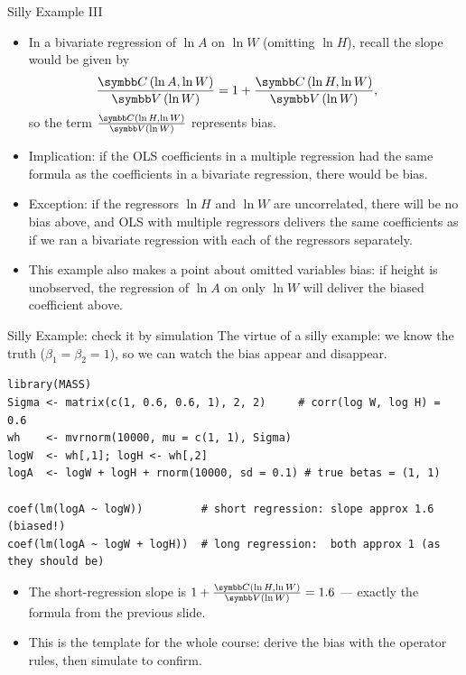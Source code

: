 \documentclass[aspectratio=169,11pt]{beamer}
\begin{document}
\begin{frame}{Silly Example III}
	\begin{itemize}
	\item In a bivariate regression of $\ln A$ on $\ln W$ (omitting $\ln H$), recall the slope would be given by \[
	\hspace*{-.5cm}\frac{\Cov\left(\ln A,\ln W\right)}{\Var\left(\ln W\right)}=1+\frac{\Cov\left(\ln H,\ln W\right)}{\Var\left(\ln W\right)},
	\]
	so the term $\frac{\Cov\left(\ln H,\ln W\right)}{\Var\left(\ln W\right)}$ represents bias. 

	\smallskip
	\item Implication: if the OLS coefficients in a multiple regression had the same formula 
	as the coefficients in a bivariate regression, there would be bias. 

	\smallskip
	\item Exception: if the regressors $\ln H$ and $\ln W$ are uncorrelated, there will be no bias above, and
	OLS with multiple regressors delivers the same coefficients as if we ran a bivariate regression with each
	of the regressors separately. 

	\smallskip
	\item This example also makes a point about omitted variables bias: if height is unobserved, the regression
	of $\ln A$ on only $\ln W$ will deliver the biased coefficient above.

\end{itemize}
\end{frame}


\begin{frame}[fragile]{Silly Example: check it by simulation}
The virtue of a silly example: we \alert{know} the truth ($\beta_1 = \beta_2 = 1$), so we can
watch the bias appear and disappear.
\begin{lstlisting}
library(MASS)
Sigma <- matrix(c(1, 0.6, 0.6, 1), 2, 2)     # corr(log W, log H) = 0.6
wh    <- mvrnorm(10000, mu = c(1, 1), Sigma)
logW  <- wh[,1]; logH <- wh[,2]
logA  <- logW + logH + rnorm(10000, sd = 0.1) # true betas = (1, 1)

coef(lm(logA ~ logW))         # short regression: slope approx 1.6 (biased!)
coef(lm(logA ~ logW + logH))  # long regression:  both approx 1 (as they should be)
\end{lstlisting}
\begin{itemize}
	\item The short-regression slope is $1 + \frac{\Cov(\ln H, \ln W)}{\Var(\ln W)} = 1.6$ --- exactly the formula from the previous slide.
	\item This is the template for the whole course: \alert{derive} the bias with the operator rules, then \alert{simulate} to confirm.
\end{itemize}
\end{frame}
\end{document}
